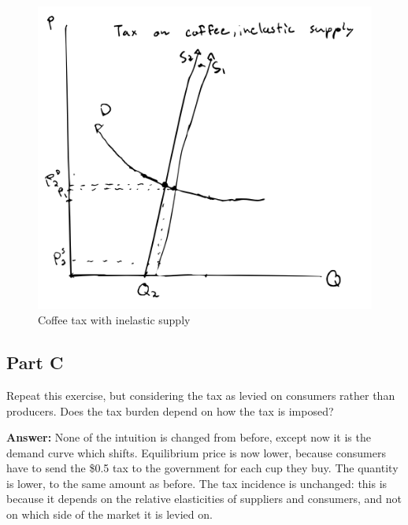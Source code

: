 \documentclass[12pt]{article}
\begin{document}
\begin{figure}
    \centering
    \includegraphics[width=.6\textwidth]{coffee_tax_is1.png}
    \caption{Coffee tax with inelastic supply}
    \label{fig:coffee_tax_is1}
\end{figure}

\subsection*{Part C}

Repeat this exercise, but considering the tax as levied on consumers rather than producers. Does the tax burden depend on how the tax is imposed?

\textbf{Answer:}
None of the intuition is changed from before, except now it is the demand curve which shifts. Equilibrium price is now lower, because consumers have to send the \$0.5 tax to the government for each cup they buy. The quantity is lower, to the same amount as before. The tax incidence is unchanged: this is because it depends on the relative elasticities of suppliers and consumers, and not on which side of the market it is levied on.
\end{document}
